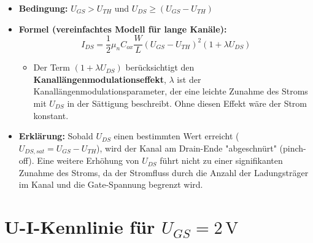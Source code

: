 \documentclass{scrarticle}
\numberwithin{equation}{section}
\begin{document}
\begin{itemize}
	\item \textbf{Bedingung:} $U_{GS} > U_{TH}$ und $U_{DS} \ge (U_{GS} - U_{TH})$
	\item \textbf{Formel (vereinfachtes Modell für lange Kanäle):}
	\begin{equation*}
		I_{DS} = \frac{1}{2} \mu_n C_{ox} \frac{W}{L} (U_{GS} - U_{TH})^2 \left( 1 + \lambda U_{DS} \right)
	\end{equation*}
	\begin{itemize}
		\item Der Term $(1 + \lambda U_{DS})$ berücksichtigt den \textbf{Kanallängenmodulationseffekt}, $\lambda$ ist der Kanallängenmodulationsparameter, der eine leichte Zunahme des Stroms mit $U_{DS}$ in der Sättigung beschreibt. Ohne diesen Effekt wäre der Strom konstant.
	\end{itemize}
	\item \textbf{Erklärung:} Sobald $U_{DS}$ einen bestimmten Wert erreicht ($U_{DS,sat} = U_{GS} - U_{TH}$), wird der Kanal am Drain-Ende "abgeschnürt" (pinch-off). Eine weitere Erhöhung von $U_{DS}$ führt nicht zu einer signifikanten Zunahme des Stroms, da der Stromfluss durch die Anzahl der Ladungsträger im Kanal und die Gate-Spannung begrenzt wird.
\end{itemize}

\section{U-I-Kennlinie für $U_{GS} = 2\,\mathrm{V}$}
\end{document}
